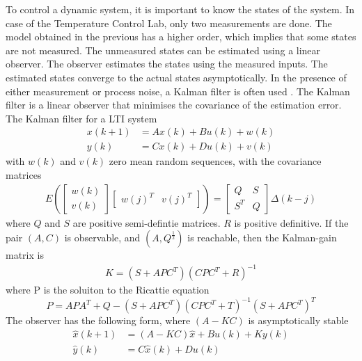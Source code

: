 To control a dynamic system, it is important to know the states of the system. In case of the Temperature Control Lab, only two measurements are done. The model obtained in the previous has a higher order, which implies that some states are not measured. The unmeasured states can be estimated using a linear observer. The observer estimates the states using the measured inputs. The estimated states converge to the actual states asymptotically.
In the presence of either measurement or process noise, a Kalman filter is often used \cite{kalmanFilter}. The Kalman filter is a linear observer that minimises the covariance of the estimation error. The Kalman filter for a LTI system \cite[p.~162]{FilteringIdentification}
\begin{align*}
    x(k+1) &= Ax(k) +Bu(k) + w(k)\\
    y(k) &= Cx(k) + Du(k) + v(k)
\end{align*}
with $w(k)$ and $v(k)$ zero mean random sequences, with the covariance matrices
\begin{align*}
    E(\begin{bmatrix} w(k) \\ v(k) \end{bmatrix} \begin{bmatrix} w(j)^T & v(j)^T \end{bmatrix}) = \begin{bmatrix} Q & S \\ S^T & Q \end{bmatrix} \Delta(k-j)
\end{align*}
where $Q$ and $S$ are positive semi-defintie matrices. $R$ is positive definitive. If the pair $(A,C)$ is observable, and $(A,Q^{\frac{1}{2}})$ is reachable, then the Kalman-gain matrix is 
\begin{align*}
    K = (S+APC^T)(CPC^T+R)^{-1}
\end{align*}
where P is the soluiton to the Ricattie equation
$$
    P = APA^T + Q - (S+APC^T)(CPC^T+T)^{-1}(S+APC^T)^T
$$
The observer has the following form, where $(A-KC)$ is asymptotically stable
\begin{align*}
    \hat{x}(k+1) &= (A-KC)\hat{x} + Bu(k) + Ky(k)\\
    \hat{y}(k) &= C\hat{x}(k) + Du(k)
\end{align*}
